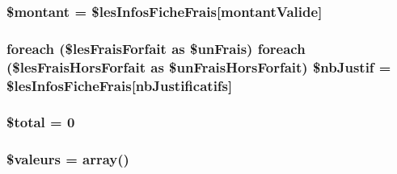 \subsubsection[{\texorpdfstring{\$montant}{$montant}}]{\setlength{\rightskip}{0pt plus 5cm}\$montant = \$les\+Infos\+Fiche\+Frais\mbox{[}\textquotesingle{}montant\+Valide\textquotesingle{}\mbox{]}}\hypertarget{v__consulte_frais_8php_a68eb0a4a32f374b4548256f8a63eb191}{}\label{v__consulte_frais_8php_a68eb0a4a32f374b4548256f8a63eb191}
\subsubsection[{\texorpdfstring{\$nb\+Justif}{$nbJustif}}]{\setlength{\rightskip}{0pt plus 5cm}foreach (\$les\+Frais\+Forfait as \$un\+Frais) foreach (\$les\+Frais\+Hors\+Forfait as \$un\+Frais\+Hors\+Forfait) \$nb\+Justif = \$les\+Infos\+Fiche\+Frais\mbox{[}\textquotesingle{}nb\+Justificatifs\textquotesingle{}\mbox{]}}\hypertarget{v__consulte_frais_8php_a61cafff25843b416c271d6a49d782de7}{}\label{v__consulte_frais_8php_a61cafff25843b416c271d6a49d782de7}
\subsubsection[{\texorpdfstring{\$total}{$total}}]{\setlength{\rightskip}{0pt plus 5cm}\$total = 0}\hypertarget{v__consulte_frais_8php_a241b818f48030b628685b2e5119c5624}{}\label{v__consulte_frais_8php_a241b818f48030b628685b2e5119c5624}
\subsubsection[{\texorpdfstring{\$valeurs}{$valeurs}}]{\setlength{\rightskip}{0pt plus 5cm}\$valeurs = array()}\hypertarget{v__consulte_frais_8php_a6981142b9d6529b79b559b4d3b057835}{}\label{v__consulte_frais_8php_a6981142b9d6529b79b559b4d3b057835}

